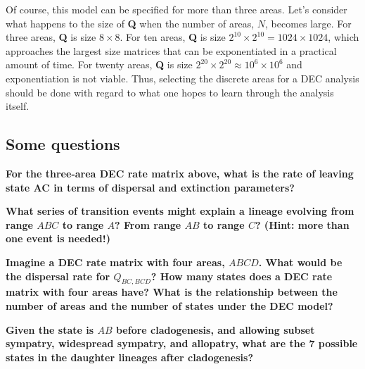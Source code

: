 Of course, this model can be specified for more than three areas.
Let's consider what happens to the size of \textbf{Q} when the number of areas, $N$, becomes large.
For three areas, \textbf{Q} is size $8 \times 8$.
For ten areas, \textbf{Q} is size $2^{10} \times 2^{10} = 1024 \times 1024$, which approaches the largest size matrices that can be exponentiated in a practical amount of time.
For twenty areas, \textbf{Q} is size $2^{20} \times 2^{20} \approx 10^6 \times 10^6$ and exponentiation is not viable.
Thus, selecting the discrete areas for a DEC analysis should be done with regard to what one hopes to learn through the analysis itself.






\subsection*{Some questions}

{\bf {} For the three-area DEC rate matrix above, what is the rate of leaving state AC in terms of dispersal and extinction parameters?}

{\bf {} What series of transition events might explain a lineage evolving from range $ABC$ to range $A$? From range $AB$ to range $C$? (Hint: more than one event is needed!)}

{ \bf {} Imagine a DEC rate matrix with four areas, $ABCD$. What would be the dispersal rate for $Q_{BC,BCD}$? How many states does a DEC rate matrix with four areas have? What is the relationship between the number of areas and the number of states under the DEC model? }

{\bf {} Given the state is $AB$ before cladogenesis, and allowing subset sympatry, widespread sympatry, and allopatry, what are the 7 possible states in the daughter lineages after cladogenesis?}

